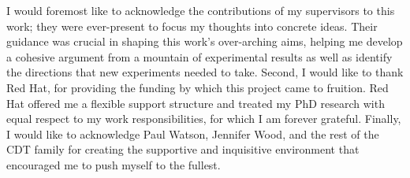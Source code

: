 \begin{acknowledgements}
 I would foremost like to acknowledge the contributions of my supervisors to this work; they were ever-present to
 focus my thoughts into concrete ideas. Their guidance was crucial in shaping this work's over-arching aims,
 helping me develop a cohesive argument from a mountain of experimental results as well as identify the directions
 that new experiments needed to take. Second, I would like to thank Red Hat, for providing the funding by which this project
 came to fruition. Red Hat offered me a flexible support structure and treated my PhD
 research with equal respect to my work responsibilities, for which I am forever grateful. Finally,
 I would like to acknowledge Paul Watson, Jennifer Wood, and the rest of the CDT family for creating the
 supportive and inquisitive environment that encouraged me to push myself to the fullest.
\end{acknowledgements}